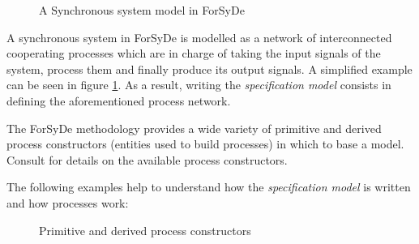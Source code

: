\begin{figure}
\centering

  \caption{A Synchronous system model in ForSyDe}
  \label{fig:concproc}
\end{figure}

A synchronous system in ForSyDe is modelled as a network of
interconnected cooperating processes which are in charge of taking the
input signals of the system, process them and finally produce its
output signals. A simplified example can be seen in figure
\ref{fig:concproc}. As a result, writing the \textit{specification
  model} consists in defining the aforementioned process
network.

The ForSyDe methodology provides a wide variety of primitive and
derived process constructors (entities used to build processes) in
which to base a model. Consult  \cite{forsyde:thesis} for details on
the available process constructors.

The following examples help to understand how the
\textit{specification model} is written and how processes
work:

\begin{figure}
\centering
{}


  \caption{Primitive and derived process constructors}
  \label{fig:primderproc}
\end{figure}




